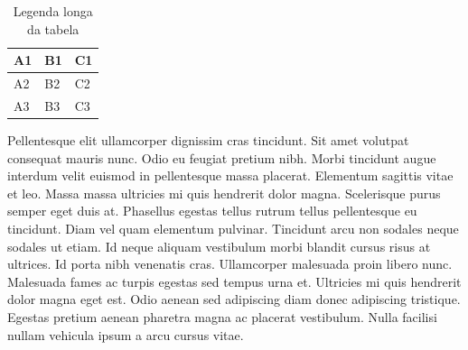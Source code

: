 \documentclass[12pt]{article}
\begin{document}
			\begin{table}[H]
				\centering
				\caption[Legenda curta da tabela]{Legenda longa da tabela}
				\label{tab:tab1}
				\begin{tabular}{ l|l|l } %
					A1 & B1 & C1 \\ \hline 
					A2 & B2 & C2 \\ \hline
					A3 & B3 & C3 \\ %
				\end{tabular}
			\end{table}
		
			Pellentesque elit ullamcorper dignissim cras tincidunt. Sit amet volutpat consequat mauris nunc. Odio eu feugiat pretium nibh. Morbi tincidunt augue interdum velit euismod in pellentesque massa placerat. Elementum sagittis vitae et leo. Massa massa ultricies mi quis hendrerit dolor magna. Scelerisque purus semper eget duis at. Phasellus egestas tellus rutrum tellus pellentesque eu tincidunt. Diam vel quam elementum pulvinar. Tincidunt arcu non sodales neque sodales ut etiam. Id neque aliquam vestibulum morbi blandit cursus risus at ultrices. Id porta nibh venenatis cras. Ullamcorper malesuada proin libero nunc. Malesuada fames ac turpis egestas sed tempus urna et. Ultricies mi quis hendrerit dolor magna eget est. Odio aenean sed adipiscing diam donec adipiscing tristique. Egestas pretium aenean pharetra magna ac placerat vestibulum. Nulla facilisi nullam vehicula ipsum a arcu cursus vitae.
\end{document}
